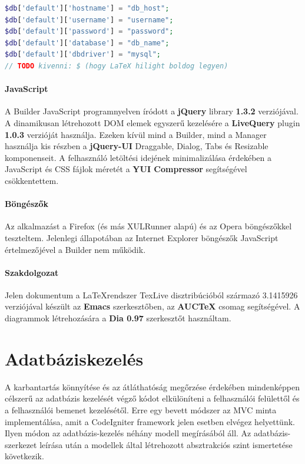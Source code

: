 \documentclass[12pt,a4paper,twoside]{article}
\begin{document}
\begin{lstlisting}[language=PHP, firstnumber=40]
$db['default']['hostname'] = "db_host";
$db['default']['username'] = "username";
$db['default']['password'] = "password";
$db['default']['database'] = "db_name";
$db['default']['dbdriver'] = "mysql";
// TODO kivenni: $ (hogy LaTeX hilight boldog legyen)
\end{lstlisting}

\paragraph{JavaScript}
A Builder JavaScript programnyelven íródott a \textbf{jQuery}\cite{JQ} library
\textbf{1.3.2} verziójával. A dinamikusan létrehozott DOM elemek egyszerű
kezelésére a \textbf{LiveQuery}\cite{JQ-LiveQuery} plugin \textbf{1.0.3}
verzióját használja. Ezeken kívül mind a Builder, mind a Manager használja
kis részben a \textbf{jQuery-UI}\cite{JQ-UI} Draggable, Dialog, Tabs és
Resizable komponenseit. A felhasználó letöltési idejének minimalizálása
érdekében a JavaScript és CSS fájlok méretét a \textbf{YUI Compressor}\cite{YUI}
segítségével csökkentettem.

\paragraph{Böngészők}
Az alkalmazást a Firefox (és más XULRunner alapú) és az Opera böngészőkkel
teszteltem. Jelenlegi állapotában az Internet Explorer böngészők JavaScript
értelmezőjével a Builder nem működik.

\paragraph{Szakdolgozat}
Jelen dokumentum a \LaTeX  rendszer TexLive disztribúcióból származó
3.1415926 verziójával készült az \textbf{Emacs} szerkesztőben, az
\textbf{AUCTeX} csomag segítségével. A diagrammok létrehozására a \textbf{Dia 0.97}
szerkesztőt használtam.


\clearpage
{}
\section{Adatbáziskezelés}

A karbantartás könnyítése és az átláthatóság megőrzése érdekében mindenképpen
célszerű az adatbázis kezelését végző kódot elkülöníteni a felhasználói
felülettől és a felhasználói bemenet kezelésétől. Erre egy bevett módszer az
MVC\cite{MVC} minta implementálása, amit a CodeIgniter framework jelen esetben
elvégez helyettünk. Ilyen módon az adatbázis-kezelés néhány modell megírásából
áll. Az adatbázis-szerkezet leírása után a modellek által létrehozott
absztrakciós szint ismertetése következik.
\end{document}
